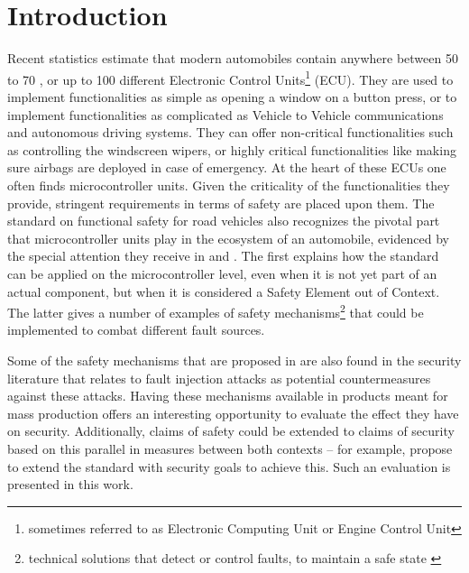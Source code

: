 \documentclass[10pt]{article}
\begin{document}

\newpage
\section{Introduction }

    Recent statistics estimate that modern automobiles contain anywhere between 50 to 70 \cite{koscher_experimental_2010}, or up to 100 \cite{brians_cyber_2016} different Electronic Control Units\footnote{sometimes referred to as Electronic Computing Unit or Engine Control Unit} (ECU). 
    They are used to implement functionalities as simple as opening a window on a button press, or to implement functionalities as complicated as Vehicle to Vehicle communications and autonomous driving systems. They can offer non-critical functionalities such as controlling the windscreen wipers, or highly critical functionalities like making sure airbags are deployed in case of emergency. 
    At the heart of these ECUs one often finds microcontroller units. %
    Given the criticality of the functionalities they provide, stringent requirements in terms of safety are placed upon them. 
    The \citet{iso26262} standard on functional safety for road vehicles also recognizes the pivotal part that microcontroller units play in the ecosystem of an automobile, evidenced by the special attention they receive in \citet[Annex A]{iso26262-10} and \citet[Annex D]{iso26262-5}. The first explains how the standard can be applied on the microcontroller level, even when it is not yet part of an actual component, but when it is considered a Safety Element out of Context. The latter gives a number of examples of safety mechanisms\footnote{technical solutions that detect or control faults, to maintain a safe state \cite{iso26262-1}} that could be implemented to combat different fault sources.

    Some of the safety mechanisms that are proposed in \citet[Annex D]{iso26262-5} are also found in the security literature  \cite{bar-el_sorcerers_2006} that relates to fault injection attacks as potential countermeasures against these attacks. Having these mechanisms available in products meant for mass production offers an interesting opportunity to evaluate the effect they have on %
    security. Additionally, claims of safety could be extended to claims of security based on this parallel in measures between both contexts -- for example, \citet{burton_automotive_2012} propose to extend the \citet{iso26262} standard with security goals to achieve this. Such an evaluation is presented in this work.%
\end{document}

